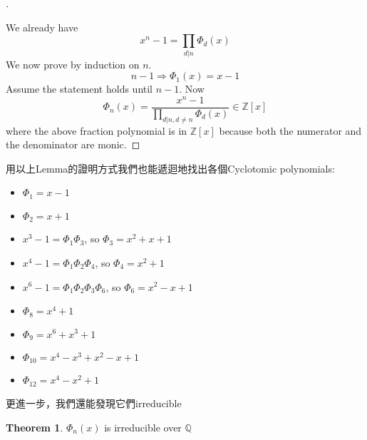 \documentclass[12pt]{article}
\theoremstyle{definition}
\newtheorem{thm}{Theorem}
\newenvironment{proofs}[1][\proofname]{%
  \begin{proof}[#1]$ $\par\nobreak\ignorespaces
}{%
  \end{proof}
}
\begin{document}
\begin{proofs}
	We already have
	\[
		x^n - 1 = \prod_{d | n} \Phi_d(x)
	\]
	We now prove by induction on $n$.
	\[
		n - 1 \Rightarrow \Phi_1(x) = x- 1
	\]
	Assume the statement holds until $n - 1$.
	Now
	\[
		\Phi_n(x) = \frac{x^n - 1}{\prod_{d|n, d \neq n} \Phi_d(x)} \in \mathbb{Z}[x]
	\]
	where the above fraction polynomial is in $\mathbb{Z}[x]$ because both the numerator and the denominator are monic.
\end{proofs}

用以上Lemma的證明方式我們也能遞迴地找出各個Cyclotomic polynomials:
\begin{itemize}
	\item $\Phi_1=x-1$
	\item $\Phi_2=x+1$
	\item $x^3-1=\Phi_1\Phi_3$, so $\Phi_3=x^2+x+1$
	\item $x^4-1=\Phi_1\Phi_2\Phi_4$, so $\Phi_4=x^2+1$
	\item $x^6-1=\Phi_1\Phi_2\Phi_3\Phi_6$, so $\Phi_6=x^2-x+1$
	\item $\Phi_8=x^4+1$
	\item $\Phi_9=x^6+x^3+1$
	\item $\Phi_{10}=x^4-x^3+x^2-x+1$
	\item $\Phi_{12}=x^4-x^2+1$
\end{itemize}

更進一步，我們還能發現它們irreducible

\begin{thm}
	$\Phi_n(x)$ is irreducible over $\mathbb{Q}$
\end{thm}
\end{document}
